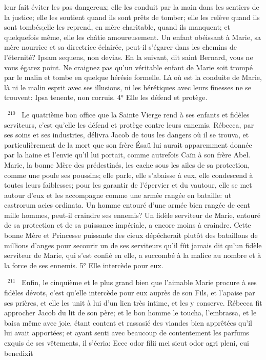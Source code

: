 \documentclass[paper=a5,pagesize=pdftex,fontsize=15pt,headinclude=on,twoside=off]{scrbook}
\newcommand{\negphantom}[1]{\settowidth{\dimen0}{#1}\hspace*{-\dimen0}}
\newcommand{\versenb}[1]{\par \vspace{10pt}~\negphantom{~${}^{#1}$~}${}^{#1}$~}
\begin{document}
leur fait éviter les pas dangereux; elle les conduit par la main dans les sentiers de la justice; elle les soutient quand
ils sont prêts de tomber; elle les relève quand ils sont tombés;elle les reprend, en mère charitable, quand ils
manquent; et quelquefois même, elle les châtie amoureusement. Un enfant obéissant à Marie, sa mère nourrice et
sa directrice éclairée, peut-il s'égarer dans les chemins de l'éternité? Ipsam sequens, non devias. En la suivant, dit
saint Bernard, vous ne vous égarez point. Ne craignez pas qu'un véritable enfant de Marie soit trompé par le malin
et tombe en quelque hérésie formelle. Là où est la conduite de Marie, là ni le malin esprit avec ses illusions, ni les
hérétiques avec leurs finesses ne se trouvent: Ipsa tenente, non corruis.
4° Elle les défend et protège.
\versenb{210} Le quatrième bon office que la Sainte Vierge rend à ses enfants et fidèles serviteurs, c'est qu'elle les défend
et protège contre leurs ennemis. Rébecca, par ses soins et ses industries, délivra Jacob de tous les dangers où il
se trouva, et particulièrement de la mort que son frère Ésaü lui aurait apparemment donnée par la haine et l'envie
qu'il lui portait, comme autrefois Caïn à son frère Abel. Marie, la bonne Mère des prédestinés, les cache sous les
ailes de sa protection, comme une poule ses poussins; elle parle, elle s'abaisse à eux, elle condescend à toutes
leurs faiblesses; pour les garantir de l'épervier et du vautour, elle se met autour d'eux et les accompagne comme
une armée rangée en bataille: ut castrorum acies ordinata. Un homme entouré d'une armée bien rangée de cent
mille hommes, peut-il craindre ses ennemis? Un fidèle serviteur de Marie, entouré de sa protection et de sa
puissance impériale, a encore moins à craindre. Cette bonne Mère et Princesse puissante des cieux dépêcherait
plutôt des bataillons de millions d'anges pour secourir un de ses serviteurs qu'il fût jamais dit qu'un fidèle serviteur
de Marie, qui s'est confié en elle, a succombé à la malice au nombre et à la force de ses ennemis.
5° Elle intercède pour eux.
\versenb{211} Enfin, le cinquième et le plus grand bien que l'aimable Marie procure à ses fidèles dévots, c'est qu'elle
intercède pour eux auprès de son Fils, et l'apaise par ses prières, et elle les unit à lui d'un lien très intime, et les y
conserve.
Rébecca fit approcher Jacob du lit de son père; et le bon homme le toucha, l'embrassa, et le baisa même avec
joie, étant content et rassasié des viandes bien apprêtées qu'il lui avait apportées; et ayant senti avec beaucoup de
contentement les parfums exquis de ses vêtements, il s'écria: Ecce odor filii mei sicut odor agri pleni, cui benedixit
\end{document}
